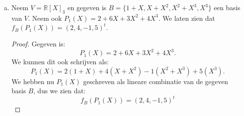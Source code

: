 \documentclass[12pt, a4paper]{article}
\begin{document}
\begin{enumerate}[(a).]
\begin{proof}
\begin{enumerate}[1.]
                \item 
                We bewijzen nu dat $f_B$ surjectief is. Dit betekent dat voor elke $\mathbf{x}_B \in W$ er een $\mathbf{x} \in V$ bestaat zodat $f(\mathbf{x}) = \mathbf{x}_B$. We willen dus een $\mathbf{x}$ vinden zodat $f(\mathbf{x}) = \mathbf{x}_B$. We bewijzen dat de volgende $\mathbf{x}$ hieraan voldoet: 
                \begin{equation} 
                    \mathbf{x} = 
                    x_{B, 1} \mathbf{b}_1 + 
                    x_{B, 2} \mathbf{b}_2 + \ldots + 
                    x_{B, n} \mathbf{b}_n
                \end{equation}
                waar $x_{B, k}$ staat voor het $k$de element van de coördinatenkolom $\mathbf{x}_B$. Bekijk $f_B(\mathbf{x})$. We zien uit de definitie van $f_B$ dat:
                \begin{equation}
                    f_B(\mathbf{x}) = (x_{B, 1}, x_{B, 2}, \ldots , x_{B, n})^t
                \end{equation}
                De rechterzijde van de vergelijking is precies de vector $\mathbf{x}_B$, dus we zien dat:
                \begin{equation}
                    f_B(\mathbf{x}) = \mathbf{x}_B
                \end{equation}
                We kunnen dus voor elke $\mathbf{x}_B \in W$ een $\mathbf{x} \in V$ vinden zodat $f_B(\mathbf{x}) = \mathbf{x}_B$. Dus $f_B$ is surjectief.

            \end{enumerate}
            Deze twee punten maakt samen dat $f_B$ bijectief is.
        \end{proof}
        Dit samen maakt dat $f_B$ een lineare bijectieve functie is en dus een isomorfisme geeft tussen $V$ en $\mathbb{R}^n$. 

        \item \label{d}
        Neem $V = \mathbb{R}[X]_3$ en gegeven is $B = \{1 + X, X + X^2, X^2 + X^3, X^3 \}$ een basis van $V$. Neem ook $P_1(X) = 2 + 6X +3X^2 + 4X^3$. We laten zien dat $f_B(P_1(X)) = (2, 4, -1, 5)^t$.
        \begin{proof}
            Gegeven is: 
            \begin{equation}
                P_1(X) = 2 + 6X +3X^2 + 4X^3.
            \end{equation}
            We kunnen dit ook schrijven als:
            \begin{equation}
                P_1(X) = 2(1 + X) + 4(X + X^2) -1(X^2 + X^3) + 5(X^3).
            \end{equation}
            We hebben nu $P_1(X)$ geschreven als lineare combinatie van de gegeven basis $B$, dus we zien dat:
            \begin{equation}
                f_B(P_1(X)) = (2, 4, -1, 5)^t
            \end{equation}

        \end{proof}


\end{enumerate}
\end{document}
